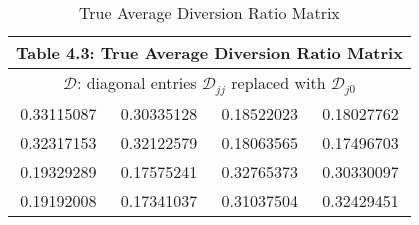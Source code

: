 
\begin{table}
\centering
\begin{tabular}{ |cccc| }
 \hline
\multicolumn{4}{|c|}{Table 4.3: True Average Diversion Ratio Matrix}
 \\
 \hline
\multicolumn{4}{|c|}{$\mathcal{D}$: diagonal entries $\mathcal{D}_{jj}$ replaced with $\mathcal{D}_{j0}$}
 \\
 \hline
 0.33115087 & 0.30335128 & 0.18522023 & 0.18027762   \\
0.32317153 & 0.32122579 & 0.18063565 & 0.17496703  \\
0.19329289 & 0.17575241 & 0.32765373 & 0.30330097  \\
0.19192008 & 0.17341037 & 0.31037504 & 0.32429451  \\
 \hline
\end{tabular}
\label{table4_3}
\caption{True Average Diversion Ratio Matrix}
\end{table}
